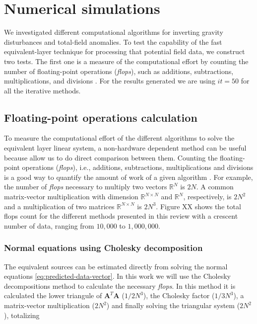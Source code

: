 \section{Numerical simulations}
\label{sec:num_simulations}

We investigated different computational algorithms for inverting gravity disturbances and total-field anomalies. To test the capability of the fast equivalent-layer technique for processing that potential field data, we construct two tests. The first one is a measure of the computational effort by counting the number of floating-point operations (\textit{flops}), such as additions, subtractions, multiplications, and divisions \citep{golub-vanloan2013}. For the results generated we are using $\textit{it} = 50$ for all the iterative methods.
 
\subsection{Floating-point operations calculation}

To measure the computational effort of the different algorithms to solve the equivalent layer linear system, a non-hardware dependent method can be useful because allow us to do direct comparison between them. Counting the floating-point operations (\textit{flops}), i.e., additions, subtractions, multiplications and divisions is a good way to quantify the amount of work of a given algorithm \citep{golub-vanloan2013}. For example, the number of \textit{flops} necessary to multiply two vectors $\mathbb{R}^{N}$ is $2N$. A common matrix-vector multiplication with dimension $\mathbb{R}^{N \times N}$ and $\mathbb{R}^{N}$, respectively, is $2N^2$ and a multiplication of two matrices $\mathbb{R}^{N \times N}$ is $2N^3$. Figure XX shows the total flops count for the different methods presented in this review with a crescent number of data, ranging from $10,000$ to $1,000,000$. 

\subsubsection{Normal equations using Cholesky decomposition}

The equivalent sources can be estimated directly from solving the normal equations \ref{eq:predicted-data-vector}. In this work we will use the Cholesky decompositions method to calculate the necessary \textit{flops}. In this method it is calculated the lower triangule of $\mathbf{A}^T\mathbf{A}$ ($1/2 N^3$), the Cholesky factor ($1/3 N^3$), a matrix-vector multiplication ($2N^2$) and finally solving the triangular system ($2N^2$), totalizing


